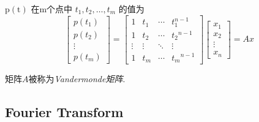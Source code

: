 \begin{definition}
    $ \mathrm{p}(\mathrm{t}) $ 在m个点中 $ t_{1}, t_{2}, \ldots, t_{m} $ 的值为
    $$
    \left[\begin{array}{c}
    p\left(t_{1}\right) \\
    p\left(t_{2}\right) \\
    \vdots \\
    p\left(t_{m}\right)
    \end{array}\right]=\left[\begin{array}{cccc}
    1 & t_{1} & \cdots & t_{1}^{n-1} \\
    1 & t_{2} & \cdots & t_{2}{ }^{n-1} \\
    \vdots & \vdots & \ddots & \vdots \\
    1 & t_{m} & \cdots & t_{m}{ }^{n-1}
    \end{array}\right]\left[\begin{array}{c}
    x_{1} \\
    x_{2} \\
    \vdots \\
    x_{n}
    \end{array}\right]=A x
    $$

    矩阵$A$被称为\textit{Vandermonde矩阵}.
\end{definition}

\subsection{Fourier Transform}

